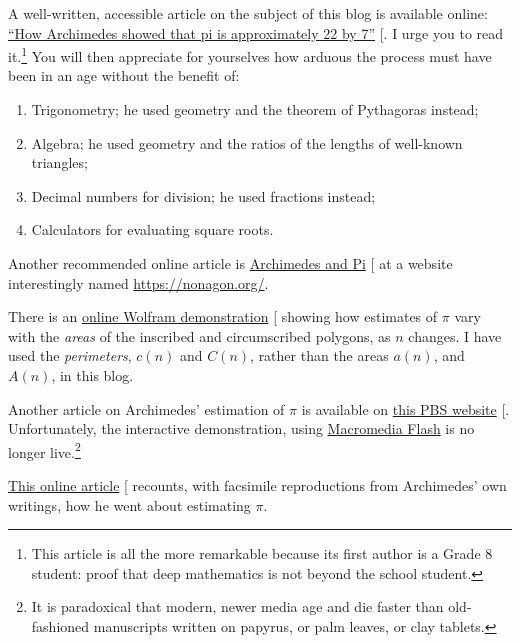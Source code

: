 \documentclass[
  a4paper,
]{article}
\begin{document}
A well-written, accessible article on the subject of this blog is
available online:
\href{https://publications.azimpremjiuniversity.edu.in/3356/1/02-DaminiAndAbhishek_PiIs22By7_Final.pdf}{``How
Archimedes showed that pi is approximately 22 by 7''}
{[}\citeproc{ref-damini-dhar-2020}{3}{]}. I urge you to read
it.\footnote{This article is all the more remarkable because its first
  author is a Grade 8 student: proof that deep mathematics is not beyond
  the school student.} You will then appreciate for yourselves how
arduous the process must have been in an age without the benefit of:

\begin{enumerate}
\item
  Trigonometry; he used geometry and the theorem of Pythagoras instead;
\item
  Algebra; he used geometry and the ratios of the lengths of well-known
  triangles;
\item
  Decimal numbers for division; he used fractions instead;
\item
  Calculators for evaluating square roots.
\end{enumerate}

Another recommended online article is
\href{https://nonagon.org/ExLibris/archimedes-pi}{Archimedes and Pi}
{[}\citeproc{ref-bertrand2014}{2}{]} at a website interestingly named
\url{https://nonagon.org/}.

There is an
\href{https://demonstrations.wolfram.com/ArchimedesApproximationOfPi/\#more}{online
Wolfram demonstration} {[}\citeproc{ref-tucker2009}{12}{]} showing how
estimates of \(\pi\) vary with the \emph{areas} of the inscribed and
circumscribed polygons, as \(n\) changes. I have used the
\emph{perimeters}, \(c(n)\) and \(C(n)\), rather than the areas
\(a(n)\), and \(A(n)\), in this blog.

Another article on Archimedes' estimation of \(\pi\) is available on
\href{ttps://www.pbs.org/wgbh/nova/physics/approximating-pi.html}{this
PBS website} {[}\citeproc{ref-groleau2003}{13}{]}. Unfortunately, the
interactive demonstration, using
\href{https://en.wikipedia.org/wiki/Adobe_Flash}{Macromedia Flash} is no
longer live.\footnote{It is paradoxical that modern, newer media age and
  die faster than old-fashioned manuscripts written on papyrus, or palm
  leaves, or clay tablets.}

\href{https://mathsciencehistory.com/2019/10/01/archimedes-and-his-pi-the-great-numerical-hope/}{This
online article} {[}\citeproc{ref-birchak2019}{14}{]} recounts, with
facsimile reproductions from Archimedes' own writings, how he went about
estimating \(\pi\).
\end{document}

